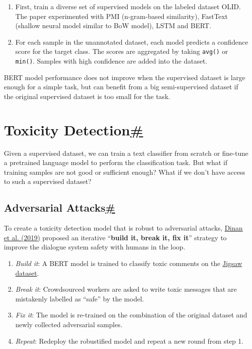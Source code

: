 \begin{enumerate}
\tightlist
\item
  First, train a diverse set of supervised models on the labeled dataset OLID. The paper experimented with PMI (n-gram-based similarity), FastText (shallow neural model similar to BoW model), LSTM and BERT.
\item
  For each sample in the unannotated dataset, each model predicts a confidence score for the target class. The scores are aggregated by taking \texttt{avg()} or \texttt{min()}. Samples with high confidence are added into the dataset.
\end{enumerate}

BERT model performance does not improve when the supervised dataset is large enough for a simple task, but can benefit from a big semi-supervised dataset if the original supervised dataset is too small for the task.

\section{\texorpdfstring{Toxicity Detection\hyperref[toxicity-detection]{\#}}{Toxicity Detection\#}}\label{toxicity-detection}

Given a supervised dataset, we can train a text classifier from scratch or fine-tune a pretrained language model to perform the classification task. But what if training samples are not good or sufficient enough? What if we don't have access to such a supervised dataset?

\subsection{\texorpdfstring{Adversarial Attacks\hyperref[adversarial-attacks]{\#}}{Adversarial Attacks\#}}\label{adversarial-attacks}

To create a toxicity detection model that is robust to adversarial attacks, \href{https://arxiv.org/abs/1908.06083}{Dinan et al. (2019)} proposed an iterative ``\textbf{build it, break it, fix it}'' strategy to improve the dialogue system safety with humans in the loop.

\begin{enumerate}
\tightlist
\item
  \emph{Build it}: A BERT model is trained to classify toxic comments on the \hyperref[jigsaw]{Jigsaw dataset}.
\item
  \emph{Break it}: Crowdsourced workers are asked to write toxic messages that are mistakenly labelled as ``safe'' by the model.
\item
  \emph{Fix it}: The model is re-trained on the combination of the original dataset and newly collected adversarial samples.
\item
  \emph{Repeat}: Redeploy the robustified model and repeat a new round from step 1.
\end{enumerate}


